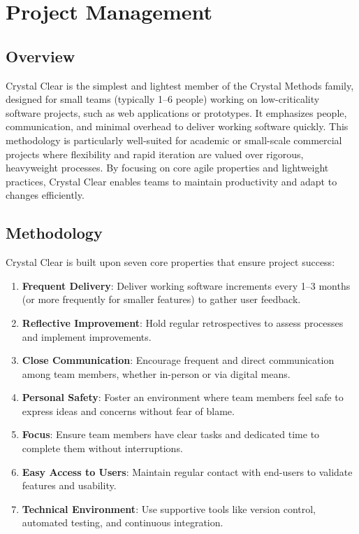 \chapter{Project Management}

\section{Overview}
Crystal Clear is the simplest and lightest member of the Crystal Methods family, designed for small teams (typically 1–6 people) working on low-criticality software projects, such as web applications or prototypes. It emphasizes people, communication, and minimal overhead to deliver working software quickly. This methodology is particularly well-suited for academic or small-scale commercial projects where flexibility and rapid iteration are valued over rigorous, heavyweight processes. By focusing on core agile properties and lightweight practices, Crystal Clear enables teams to maintain productivity and adapt to changes efficiently.

\section{Methodology}
Crystal Clear is built upon seven core properties that ensure project success:
\begin{enumerate}
    \item \textbf{Frequent Delivery}: Deliver working software increments every 1–3 months (or more frequently for smaller features) to gather user feedback.
    \item \textbf{Reflective Improvement}: Hold regular retrospectives to assess processes and implement improvements.
    \item \textbf{Close Communication}: Encourage frequent and direct communication among team members, whether in-person or via digital means.
    \item \textbf{Personal Safety}: Foster an environment where team members feel safe to express ideas and concerns without fear of blame.
    \item \textbf{Focus}: Ensure team members have clear tasks and dedicated time to complete them without interruptions.
    \item \textbf{Easy Access to Users}: Maintain regular contact with end-users to validate features and usability.
    \item \textbf{Technical Environment}: Use supportive tools like version control, automated testing, and continuous integration.
\end{enumerate}

